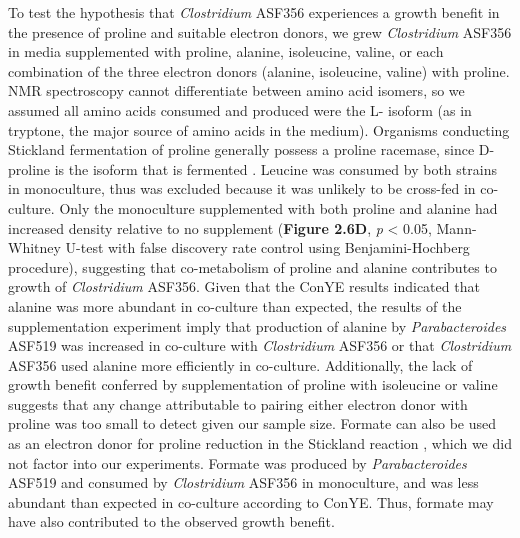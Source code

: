 \documentclass[11pt,twocolumn,notitlepage,openany,twoside]{book}
\begin{document}
\begin{refsection}
To test the hypothesis that \textit{Clostridium} ASF356 experiences a growth benefit in the presence of proline and suitable electron donors, we grew \textit{Clostridium} ASF356 in media supplemented with proline, alanine, isoleucine, valine, or each combination of the three electron donors (alanine, isoleucine, valine) with proline. NMR spectroscopy cannot differentiate between amino acid isomers, so we assumed all amino acids consumed and produced were the L- isoform (as in tryptone, the major source of amino acids in the medium). Organisms conducting Stickland fermentation of proline generally possess a proline racemase, since D-proline is the isoform that is fermented \cite{Watanabe2015-wa}. Leucine was consumed by both strains in monoculture, thus was excluded because it was unlikely to be cross-fed in co-culture. Only the monoculture supplemented with both proline and alanine had increased density relative to no supplement (\textbf{Figure 2.6D}, \textit{p} < 0.05, Mann-Whitney U-test with false discovery rate control using Benjamini-Hochberg procedure), suggesting that co-metabolism of proline and alanine contributes to growth of \textit{Clostridium} ASF356. Given that the ConYE results indicated that alanine was more abundant in co-culture than expected, the results of the supplementation experiment imply that production of alanine by \textit{Parabacteroides} ASF519 was increased in co-culture with \textit{Clostridium} ASF356 or that \textit{Clostridium} ASF356 used alanine more efficiently in co-culture. Additionally, the lack of growth benefit conferred by supplementation of proline with isoleucine or valine suggests that any change attributable to pairing either electron donor with proline was too small to detect given our sample size. Formate can also be used as an electron donor for proline reduction in the Stickland reaction \cite{Kabisch1999-jf}, which we did not factor into our experiments. Formate was produced by \textit{Parabacteroides} ASF519 and consumed by \textit{Clostridium} ASF356 in monoculture, and was less abundant than expected in co-culture according to ConYE. Thus, formate may have also contributed to the observed growth benefit.


\end{refsection}
\end{document}
